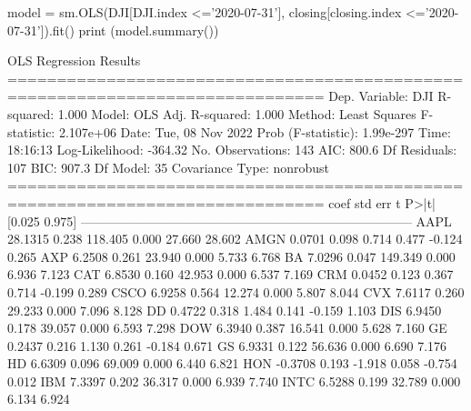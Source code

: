 \begin{solution}
\begin{ipython}
model = sm.OLS(DJI[DJI.index <='2020-07-31'], 
               closing[closing.index <='2020-07-31']).fit()
print (model.summary())
\end{ipython}
\begin{ioutput}
                          OLS Regression Results                            
==============================================================================
Dep. Variable:                    DJI   R-squared:                       1.000
Model:                            OLS   Adj. R-squared:                  1.000
Method:                 Least Squares   F-statistic:                 2.107e+06
Date:                Tue, 08 Nov 2022   Prob (F-statistic):          1.99e-297
Time:                        18:16:13   Log-Likelihood:                -364.32
No. Observations:                 143   AIC:                             800.6
Df Residuals:                     107   BIC:                             907.3
Df Model:                          35                                         
Covariance Type:            nonrobust                                         
==============================================================================
coef    std err          t      P>|t|      [0.025      0.975]
------------------------------------------------------------------------------
AAPL          28.1315      0.238    118.405      0.000      27.660      28.602
AMGN           0.0701      0.098      0.714      0.477      -0.124       0.265
AXP            6.2508      0.261     23.940      0.000       5.733       6.768
BA             7.0296      0.047    149.349      0.000       6.936       7.123
CAT            6.8530      0.160     42.953      0.000       6.537       7.169
CRM            0.0452      0.123      0.367      0.714      -0.199       0.289
CSCO           6.9258      0.564     12.274      0.000       5.807       8.044
CVX            7.6117      0.260     29.233      0.000       7.096       8.128
DD             0.4722      0.318      1.484      0.141      -0.159       1.103
DIS            6.9450      0.178     39.057      0.000       6.593       7.298
DOW            6.3940      0.387     16.541      0.000       5.628       7.160
GE             0.2437      0.216      1.130      0.261      -0.184       0.671
GS             6.9331      0.122     56.636      0.000       6.690       7.176
HD             6.6309      0.096     69.009      0.000       6.440       6.821
HON           -0.3708      0.193     -1.918      0.058      -0.754       0.012
IBM            7.3397      0.202     36.317      0.000       6.939       7.740
INTC           6.5288      0.199     32.789      0.000       6.134       6.924

\end{ioutput}
\end{solution}
